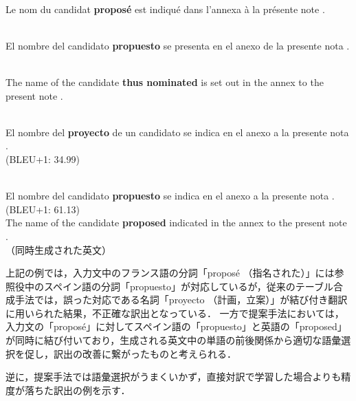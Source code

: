 \documentclass[japanese]{jnlp_1.4}
\begin{document}
\vspace{0.5\Cvs}
\begin{description}
\fontsize{8.5pt}{13.3pt}\selectfont
\item[入力文（フランス語）：]\mbox{}\\
Le nom du candidat \textbf{propos\'{e}} est indiqu\'{e} dans l'annexa \`{a} la pr\'{e}sente note .
\item[参照訳（スペイン語）：]\mbox{}\\
El nombre del candidato \textbf{propuesto} se presenta en el anexo de la presente nota .
\item[対応する英文：]\mbox{}\\
The name of the candidate \textbf{thus nominated} is set out in the annex to the present note .
\item[Tri. SCFG:]\mbox{}\\
El nombre del \textbf{proyecto} de un candidato se indica en el anexo a la presente nota . \\ (BLEU+1: 34.99)
\item[Tri. MSCFG w/ PvtLM 5M:]\mbox{}\\
El nombre del candidato \textbf{propuesto} se indica en el anexo a la presente nota . (BLEU+1: 61.13) \\
The name of the candidate \textbf{proposed} indicated in the annex to the present note . \\ （同時生成された英文）
\end{description}
\vspace{0.5\Cvs}

上記の例では，入力文中のフランス語の分詞「propos\'{e} （指名された）」には参照役中のスペイン語の分詞「propuesto」が対応しているが，従来のテーブル合成手法では，誤った対応である名詞「proyecto （計画，立案）」が結び付き翻訳に用いられた結果，不正確な訳出となっている．
一方で提案手法においては，入力文の「propos\'{e}」に対してスペイン語の「propuesto」と英語の「proposed」が同時に結び付いており，生成される英文中の単語の前後関係から適切な語彙選択を促し，訳出の改善に繋がったものと考えられる．

逆に，提案手法では語彙選択がうまくいかず，直接対訳で学習した場合よりも精度が落ちた訳出の例を示す．
\end{document}
